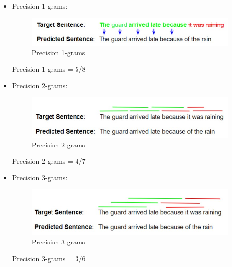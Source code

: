 \documentclass[14pt, a4paper]{article}
\numberwithin{equation}{section}
\numberwithin{algorithm}{section}
\numberwithin{figure}{section}
\numberwithin{dl}{section}
\numberwithin{md}{section}
\numberwithin{bd}{section}
\numberwithin{dn}{section}
\numberwithin{hq}{section}
\begin{document}
    \begin{itemize}
        \item Precision 1-grams:
        
        \begin{figure}[h!] \centering

            \includegraphics[scale=0.8]{BLEU_1.jpg}
            \caption{Precision 1-grams}

        \end{figure}

        Precision 1-grams = 5/8

        \item Precision 2-grams:
        
        \begin{figure}[h!] \centering

            \includegraphics[scale=0.8]{BLEU_2.jpg}
            \caption{Precision 2-grams}

        \end{figure}

        Precision 2-grams = 4/7

        \item Precision 3-grams:
        
        \begin{figure}[h!] \centering

            \includegraphics[scale=0.8]{BLEU_3.jpg}
            \caption{Precision 3-grams}

        \end{figure}

        Precision 3-grams = 3/6


\end{itemize}
\end{document}

